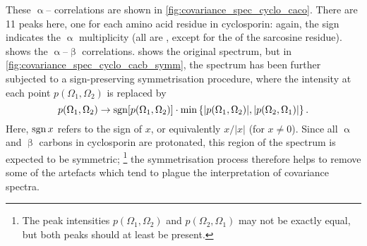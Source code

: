 These $\upalpha$-- correlations are shown in \cref{fig:covariance_spec_cyclo_caco}.
There are 11 peaks here, one for each amino acid residue in cyclosporin: again, the sign indicates the $\upalpha$ multiplicity (all are , except for the  of the sarcosine residue).
 shows the $\upalpha$--$\upbeta$ correlations.
 shows the original spectrum, but in \cref{fig:covariance_spec_cyclo_cacb_symm}, the spectrum has been further subjected to a sign-preserving symmetrisation procedure, where the intensity at each point $p(\Omega_1, \Omega_2)$ is replaced by
\begin{equation}
    \label{eq:covariance_symmetrisation}
    p(\Omega_1, \Omega_2) \to \operatorname*{sgn}[p(\Omega_1, \Omega_2)] \cdot \min\left\{|p(\Omega_1, \Omega_2)|, |p(\Omega_2, \Omega_1)|\right\}.
\end{equation}
Here, $\operatorname*{sgn}{x}$ refers to the sign of $x$, or equivalently $x / |x|$ (for $x \neq 0$).
Since all $\upalpha$ and $\upbeta$ carbons in cyclosporin are protonated, this region of the spectrum is expected to be symmetric;%
\footnote{The peak intensities $p(\Omega_1, \Omega_2)$ and $p(\Omega_2, \Omega_1)$ may not be exactly equal, but both peaks should at least be present.}
the symmetrisation process therefore helps to remove some of the artefacts which tend to plague the interpretation of covariance spectra.


